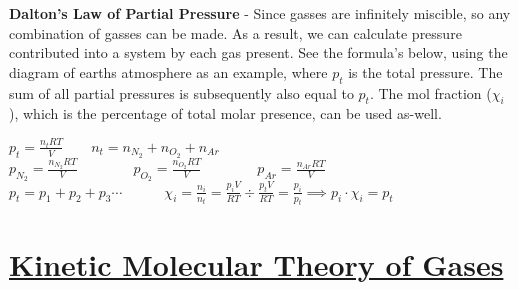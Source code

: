 \documentclass{article}
\begin{document}
	\noindent\textbf{Dalton's Law of Partial Pressure} - Since gasses are infinitely miscible, so any combination of gasses can be made. As a result, we can calculate pressure contributed into a system by each gas present. See the formula's below, using the diagram of earths atmosphere as an example, where $p_t$ is the total pressure. The sum of all partial pressures is subsequently also equal to $p_t$. The mol fraction ($\chi_i$), which is the percentage of total molar presence, can be used as-well.
	\begin{qq}
		
		\begin{center}
			$p_{t}=\frac{n_tRT}{V}\quad\quad n_t=n_{N_2}+n_{O_2}+n_{Ar}$\\
			\vspace{5pt}
			$p_{N_2}=\frac{n_{N_2}RT}{V}\quad\quad\quad \quad p_{O_2}=\frac{n_{O_2}RT}{V}\quad \quad\quad\quad p_{Ar}=\frac{n_{Ar}RT}{V}$\\
			\vspace{7.5pt}
			$p_t=p_1+p_2+p_3\cdots \quad\quad\quad \chi_i=\frac{n_i}{n_t}=\frac{p_iV}{RT}\div\frac{p_tV}{RT}=\frac{p_i}{p_t} \implies p_i\cdot\chi_i=p_t$
		\end{center}
		
	\end{qq}
	\begin{center}
	\end{center}
	
	
	\section*{\LARGE\uline{Kinetic Molecular Theory of Gases}}
	
\end{document}
